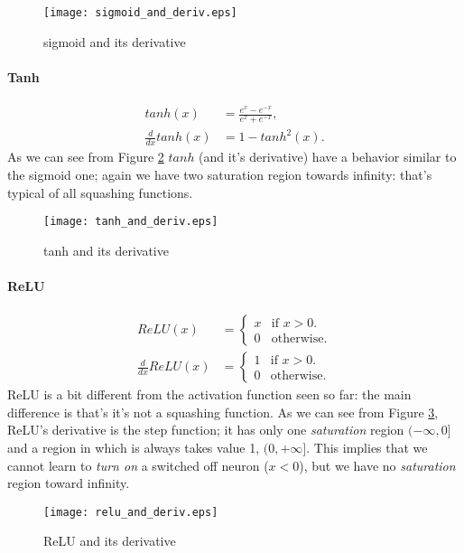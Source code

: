 \begin{figure}[ht]
  \centering
    \texttt{[image: sigmoid\_and\_deriv.eps]}
  \caption{sigmoid and its derivative}
\label{sigmoid_plot}
\end{figure}

\paragraph{Tanh}
\begin{align}
 tanh(x)&=\frac{e^x-e^{-x}}{e^x+e^{-x}}, \\
 \frac{d}{dx}tanh(x)&= 1 - tanh^2(x).  
\end{align}
As we can see from Figure \ref{tanh_plot} $tanh$ (and it's derivative) have a behavior similar to the sigmoid one; again we have two saturation region towards
infinity: that's typical of all squashing functions.



\begin{figure}[ht]
  \centering
    \texttt{[image: tanh\_and\_deriv.eps]}
  \caption{tanh and its derivative}
\label{tanh_plot}
\end{figure}



\paragraph{ReLU}


\begin{align}
  ReLU(x)&=\begin{cases}
    x & \text{if $x>0$}.\\
    0 & \text{otherwise}.
  \end{cases} \\ 
   \frac{d}{dx}ReLU(x)&=\begin{cases}
    1 & \text{if $x>0$}.\\
    0 & \text{otherwise}.
  \end{cases}
\end{align}
ReLU is a bit different from the activation function seen so far: the main difference is that's it's not a squashing function.
As we can see from Figure \ref{relu_plot}, ReLU's derivative is the step function; it has only one \textit{saturation} region $(-\infty, 0]$ and a region in which is always takes value 1, $(0,+\infty]$.
This implies that we cannot learn to \textit{turn on} a switched off neuron ($x<0$), but we have no \textit{saturation} region toward infinity.

\begin{figure}[ht]
  \centering
    \texttt{[image: relu\_and\_deriv.eps]}
  \caption{ReLU and its derivative}
\label{relu_plot}
\end{figure}
